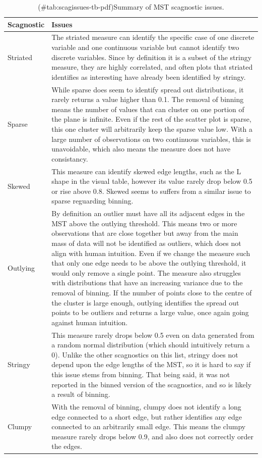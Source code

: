 \begin{Schunk}
\begin{table}

\caption{(\#tab:scagissues-tb-pdf)Summary of MST scagnostic issues.}
\centering
\begin{tabular}[t]{l>{\raggedright\arraybackslash}p{12cm}}
\toprule
Scagnostic & Issues\\
\midrule
Striated & The striated measure can identify the specific case of one discrete variable and one continuous variable but cannot identify two discrete variables. Since by definition it is a subset of the stringy measure, they are highly correlated, and often plots that striated identifies as interesting have already been identified by stringy.\\
Sparse & While sparse does seem to identify spread out distributions, it rarely returns a value higher than 0.1. The removal of binning means the number of values that can cluster on one portion of the plane is infinite. Even if the rest of the scatter plot is sparse, this one cluster will arbitrarily keep the sparse value low. With a large number of observations on two continuous variables, this is unavoidable, which also means the measure does not have consistancy.\\
Skewed & This measure can identify skewed edge lengths, such as the L shape in the visual table, however its value rarely drop below 0.5 or rise above 0.8. Skewed seems to suffers from a similar issue to sparse reguarding binning.\\
Outlying & By definition an outlier must have all its adjacent edges in the MST above the outlying threshold. This means two or more observations that are close together but away from the main mass of data will not be identified as outliers, which does not align with human intuition. Even if we change the measure such that only one edge needs to be above the outlying threshold, it would only remove a single point. The measure also struggles with distributions that have an increasing variance due to the removal of binning. If the number of points close to the centre of the cluster is large enough, outlying identifies the spread out points to be outliers and returns a large value, once again going against human intuition.\\
Stringy & This measure rarely drops below 0.5 even on data generated from a random normal distribution (which should intuitively return a 0). Unlike the other scagnostics on this list, stringy does not depend upon the edge lengths of the MST, so it is hard to say if this issue stems from binning. That being said, it was not reported in the binned version of the scagnostics, and so is likely a result of binning.\\
\addlinespace
Clumpy & With the removal of binning, clumpy does not identify a long edge connected to a short edge, but rather identifies any edge connected to an arbitrarily small edge. This means the clumpy measure rarely drops below 0.9, and also does not correctly order the edges.\\
\bottomrule
\end{tabular}
\end{table}

\end{Schunk}

